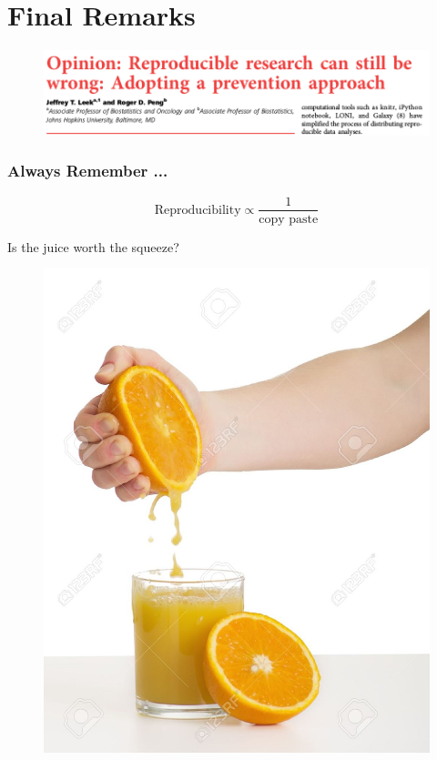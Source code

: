 \documentclass[10pt]{beamer}\usepackage[]{graphicx}\usepackage[]{color}
\begin{document}
\section{Final Remarks}

\begin{frame}
\begin{figure}[h!]
\centering
\includegraphics[scale=0.30, keepaspectratio]{./leek}
\end{figure}
\end{frame}

\begin{frame}
\frametitle{Always Remember ...}

\[ \textrm{Reproducibility} \propto \frac{1}{\textrm{copy paste}}  \]


\end{frame}


\begin{frame}{Is the juice worth the squeeze?}
\begin{figure}[h!]
\centering
\includegraphics[scale=0.40, keepaspectratio]{./juice}
\end{figure}
\end{frame}
\end{document}

